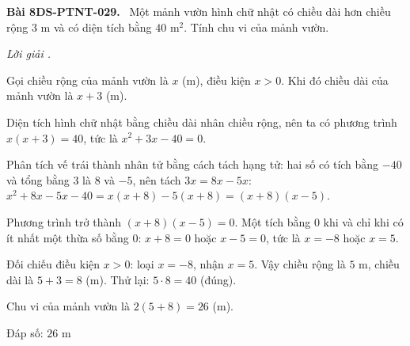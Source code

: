 \documentclass[12pt,a4paper]{article}
\newenvironment{problem}[1][]{\par\medskip\noindent\textbf{Bài #1.}\ }{\par}
\newenvironment{solution}[1][]{\par\noindent\textit{Lời giải #1.}\par}{\par}
\begin{document}
\begin{problem}[8DS-PTNT-029]
Một mảnh vườn hình chữ nhật có chiều dài hơn chiều rộng $3$ m và có diện tích bằng $40$ m$^2$. Tính chu vi của mảnh vườn.

\begin{solution}
Gọi chiều rộng của mảnh vườn là $x$ (m), điều kiện $x > 0$. Khi đó chiều dài của mảnh vườn là $x + 3$ (m).

Diện tích hình chữ nhật bằng chiều dài nhân chiều rộng, nên ta có phương trình $x(x + 3) = 40$, tức là $x^2 + 3x - 40 = 0$.

Phân tích vế trái thành nhân tử bằng cách tách hạng tử: hai số có tích bằng $-40$ và tổng bằng $3$ là $8$ và $-5$, nên tách $3x = 8x - 5x$: $x^2 + 8x - 5x - 40 = x(x + 8) - 5(x + 8) = (x + 8)(x - 5)$.

Phương trình trở thành $(x + 8)(x - 5) = 0$. Một tích bằng $0$ khi và chỉ khi có ít nhất một thừa số bằng $0$: $x + 8 = 0$ hoặc $x - 5 = 0$, tức là $x = -8$ hoặc $x = 5$.

Đối chiếu điều kiện $x > 0$: loại $x = -8$, nhận $x = 5$. Vậy chiều rộng là $5$ m, chiều dài là $5 + 3 = 8$ (m). Thử lại: $5 \cdot 8 = 40$ (đúng).

Chu vi của mảnh vườn là $2(5 + 8) = 26$ (m).

Đáp số: $\boxed{26 \text{ m}}$
\end{solution}
\end{problem}
\end{document}
